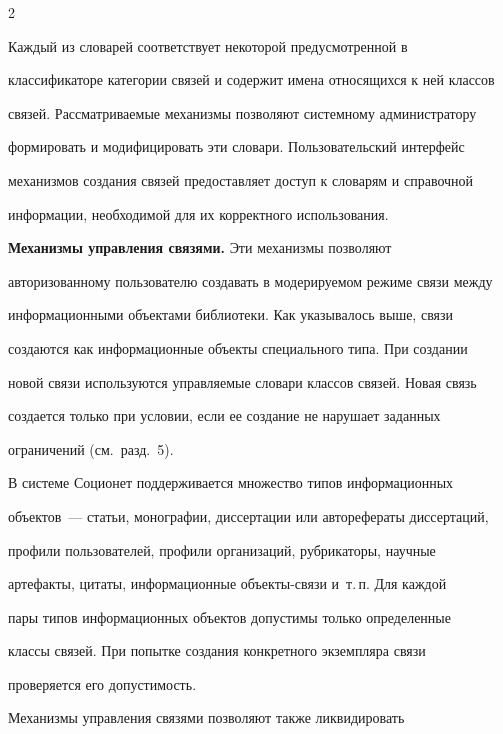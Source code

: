 \begin{multicols}{2}
  


  Каждый из словарей соответствует некоторой предусмотренной в 


классификаторе категории связей и содержит имена относящихся к ней классов 


связей. Рассматриваемые механизмы позволяют системному администратору 


формировать и модифицировать эти словари. Пользовательский интерфейс 


механизмов создания связей предоставляет доступ к словарям и справочной 


информации, необходимой для их корректного использования. 


  


  \smallskip


  


  \textbf{Механизмы управления связями.} Эти механизмы позволяют 


авторизованному пользователю создавать в модерируемом режиме связи между 


информационными объектами библиотеки. Как указывалось выше, связи 


создаются как информационные объекты специального типа. При создании 


новой связи используются управляемые словари классов связей. Новая связь 


создается только при условии, если ее создание не нарушает заданных 


ограничений (см.\ разд.~5). 


  


  В системе Соционет поддерживается множество типов информационных 


объектов~--- статьи, монографии, диссертации или авторефераты диссертаций, 


профили пользователей, профили организаций, рубрикаторы, научные 


артефакты, цитаты, информационные объек\-ты-свя\-зи и~т.\,п. Для каждой 


пары типов информационных объектов допустимы только определенные 


классы связей. При попытке создания конкретного экземпляра связи 


проверяется его допустимость. 


  


  Механизмы управления связями позволяют также ликвидировать 



\end{multicols}
